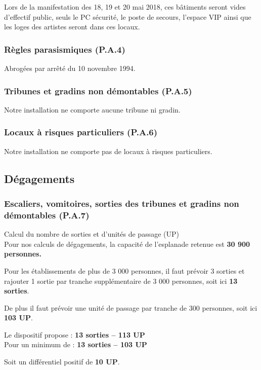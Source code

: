 \documentclass[hidelinks, paper=a4, fontsize=13pt]{report}
\begin{document}
Lors de la manifestation des 18, 19 et 20 mai 2018, ces bâtiments seront vides d’effectif public, seuls le PC sécurité, le poste de secours, l'espace VIP ainsi que les loges des artistes seront dans ces locaux. 


\subsubsection{Règles parasismiques (P.A.4)} 
Abrogées par arrêté du 10 novembre 1994. 
\subsubsection{Tribunes et gradins non démontables (P.A.5) } 
Notre installation ne comporte aucune tribune ni gradin.
\subsubsection{Locaux à risques particuliers (P.A.6)}
Notre installation ne comporte pas de locaux à risques particuliers.
\subsection{Dégagements}

\subsubsection{Escaliers, vomitoires, sorties des tribunes et gradins non démontables (P.A.7)}

Calcul du nombre de sorties et d’unités de passage (UP) 
\\
Pour nos calculs de dégagements, la capacité de l’esplanade retenue est \textbf{30 900 personnes.}

Pour les établissements de plus de 3 000 personnes, il faut prévoir 3 sorties et rajouter 1 sortie par tranche supplémentaire de 3 000 personnes, soit ici \textbf{13 sorties}.

De plus il faut prévoir une unité de passage par tranche de 300 personnes, soit ici \textbf{103 UP}. \\

\begin{center}
	Le dispositif propose :        \textbf{13 sorties – 113 UP}\\
	Pour un minimum de :         \textbf{13 sorties – 103 UP}
\end{center}
Soit un différentiel positif de \textbf{10 UP}. \\
\end{document}
